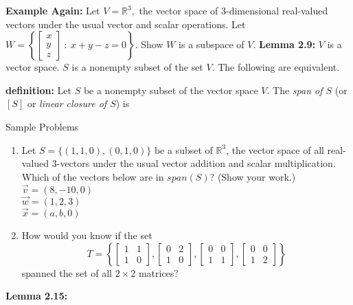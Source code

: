 \documentclass[11pt,fleqn]{article}
\begin{document}
\renewcommand{\headrulewidth}{0pt}
\newcommand{\blank}[1]{\rule{#1}{0.75pt}}
\renewcommand{\d}{\displaystyle}

\vspace*{-0.7in}

\begin{center}
  \large {}
\end{center}

\noindent\textbf{Example Again: } Let $V=\mathbb{R}^3,$ the vector space of 3-dimensional real-valued vectors under the usual vector and scalar operations. Let $W=\left\{\begin{bmatrix} x \\ y \\ z \end{bmatrix} \: : \: x+y-z=0\right\}.$ Show $W$ is a subspace of $V.$
\vfill
\noindent\textbf{Lemma 2.9:} $V$ is a vector space. $S$ is a nonempty subset of the set $V$. The following are equivalent.

\vspace{2in}

\noindent\textbf{definition:} Let $S$ be a nonempty subset of the vector space $V$. The \emph{span of $S$} (or $[S]$ or \emph{linear closure of $S$}) is

\vspace{1.5in}

\newpage
\noindent Sample Problems
\begin{enumerate}
\item Let $S=\{ (1,1,0), (0,1,0)\}$ be a subset of $\mathbb{R}^3$, the vector space of all real-valued 3-vectors under the usual vector addition and scalar multiplication. Which of the vectors below are in $span(S)$? (Show your work.)\\

 $\vec{v}=(8,-10,0)$\\
 
 $\vec{w}=(1,2,3)$\\
 
 $\vec{x}=(a,b,0)$\\
 \vspace{1in}

 \item How would you know if the set $$T=\left\{ 
 \begin{bmatrix} 1&1\\1&0\end{bmatrix},
 \begin{bmatrix}  0&2\\1&0\end{bmatrix},
 \begin{bmatrix} 0&0\\1&1\end{bmatrix},
 \begin{bmatrix} 0&0\\1&2\end{bmatrix}
 \right\}$$ spanned the set of all $2 \times 2$ matrices?
 \vfill
\end{enumerate}
\noindent\textbf{Lemma 2.15:} \\
\vspace{.5in}
\end{document}
